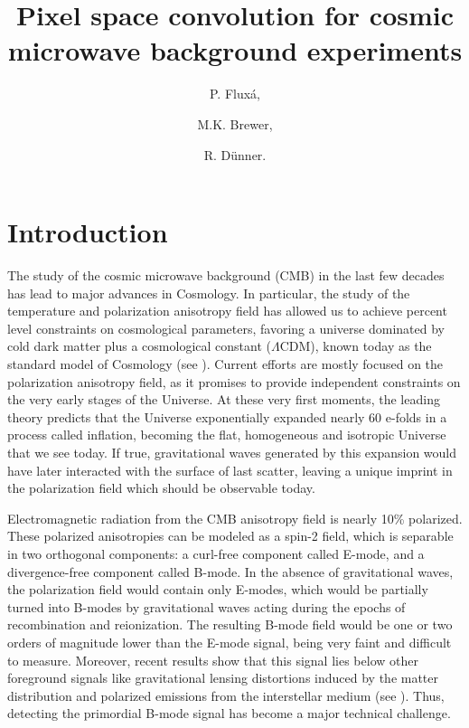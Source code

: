 \documentclass[a4paper,11pt]{article}
\title{\boldmath Pixel space convolution for cosmic microwave background experiments}
\author[a]{P. Flux\'a, }
\author[b]{M.K. Brewer, }
\author[a]{R. D\"unner.}
\affiliation[a]{Instituto de Astrof\'isica, Pontificia Universidad Cat\'olica de Chile ,\\Vicu\~na Mackenna 4860, Chile}
\affiliation[b]{Department of Astronomy, Johns Hopkins University,\\Baltimore MD, USA}
\begin{document}
\maketitle
\flushbottom


\section{Introduction}


The study of the cosmic microwave background (CMB) in the last few decades has lead to major advances in Cosmology. In particular, the study of the temperature and polarization anisotropy field has allowed us to achieve percent level constraints on cosmological parameters, favoring a universe dominated by cold dark matter plus a cosmological constant ($\Lambda$CDM), known today as the standard model of Cosmology (see \cite{2016A&A...594A..12P}). Current efforts are mostly focused on the polarization anisotropy field, as it promises to provide independent constraints on the very early stages of the Universe. At these very first moments, the leading theory predicts that the Universe exponentially expanded nearly 60 e-folds in a process called inflation, becoming the flat, homogeneous and isotropic Universe that we see today. If true, gravitational waves generated by this expansion would have later interacted with the surface of last scatter, leaving a unique imprint in the polarization field which should be observable today.

Electromagnetic radiation from the CMB anisotropy field is nearly 10\% polarized. These polarized anisotropies can be modeled as a spin-2 field, which is separable in two orthogonal components: a curl-free component called E-mode, and a divergence-free component called B-mode. In the absence of gravitational waves, the polarization field would contain only E-modes, which would be partially turned into B-modes by gravitational waves acting during the epochs of recombination and reionization. The resulting B-mode field would be one or two orders of magnitude lower than the E-mode signal, being very faint and difficult to measure. Moreover, recent results show that this signal lies below other foreground signals like gravitational lensing distortions induced by the matter distribution and polarized emissions from the interstellar medium (see \cite{2018PhRvL.121v1301B}). Thus, detecting the primordial B-mode signal has become a major technical challenge.
\end{document}
